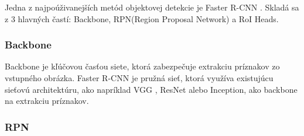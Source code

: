 Jedna z najpoúživanejších metód objektovej detekcie je Faster R-CNN \cite{Faster}. Skladá sa z 3 hlavných častí: Backbone, RPN(Region Proposal Network) a RoI Heads. 

\subsubsection{Backbone}

Backbone je kľúčovou časťou siete, ktorá zabezpečuje extrakciu príznakov zo vstupného obrázka. Faster R-CNN je pružná sieť, ktorá využíva existujúcu sieťovú architektúru, ako napríklad VGG \cite{VGG}, ResNet \cite{ResNet} alebo Inception, ako backbone na extrakciu príznakov.

\subsubsection{RPN}

